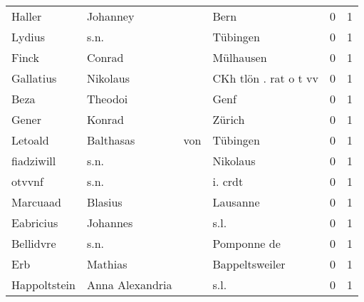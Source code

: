 \begin{center}
\begin{tiny}
\begin{longtabu}{llllrr}
                   Haller &                           Johanney &             &                                        Bern &          0 &         1 \\
                   Lydius &                               s.n. &             &                                    Tübingen &          0 &         1 \\
                    Finck &                             Conrad &             &                                   Mülhausen &          0 &         1 \\
                Gallatius &                           Nikolaus &             &                       CKh tlön . rat o t vv &          0 &         1 \\
                     Beza &                            Theodoi &             &                                        Genf &          0 &         1 \\
                    Gener &                             Konrad &             &                                      Zürich &          0 &         1 \\
                  Letoald &                          Balthasas &         von &                                    Tübingen &          0 &         1 \\
               fiadziwill &                               s.n. &             &                                    Nikolaus &          0 &         1 \\
                   otvvnf &                               s.n. &             &                                     i. crdt &          0 &         1 \\
                 Marcuaad &                            Blasius &             &                                    Lausanne &          0 &         1 \\
                Eabricius &                           Johannes &             &                                        s.l. &          0 &         1 \\
                Bellidvre &                               s.n. &             &                                 Pomponne de &          0 &         1 \\
                      Erb &                            Mathias &             &                              Bappeltsweiler &          0 &         1 \\
             Happoltstein &                    Anna Alexandria &             &                                        s.l. &          0 &         1 \\

\end{longtabu}
\end{tiny}
\end{center}

